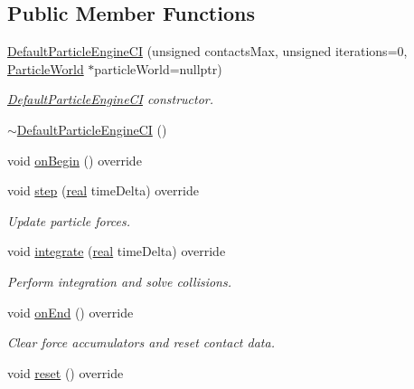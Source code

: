 \subsection*{Public Member Functions}
\begin{DoxyCompactItemize}
\item 
\mbox{\hyperlink{classr3_1_1_default_particle_engine_c_i_a5f7619a5dd227d681d5dcbde6e8368eb}{Default\+Particle\+Engine\+CI}} (unsigned contacts\+Max, unsigned iterations=0, \mbox{\hyperlink{classr3_1_1_particle_world}{Particle\+World}} $\ast$particle\+World=nullptr)
\begin{DoxyCompactList}\small\item\em \mbox{\hyperlink{classr3_1_1_default_particle_engine_c_i}{Default\+Particle\+Engine\+CI}} constructor. \end{DoxyCompactList}\item 
\mbox{\hyperlink{classr3_1_1_default_particle_engine_c_i_afb7df43eb7fe45d6bcb15c39e3c30849}{$\sim$\+Default\+Particle\+Engine\+CI}} ()
\item 
void \mbox{\hyperlink{classr3_1_1_default_particle_engine_c_i_aaf2e9ca87bff5e48c8eb59384e9cf180}{on\+Begin}} () override
\item 
void \mbox{\hyperlink{classr3_1_1_default_particle_engine_c_i_a7c58fd00ec521410e1b412e9885ee0d2}{step}} (\mbox{\hyperlink{namespacer3_ab2016b3e3f743fb735afce242f0dc1eb}{real}} time\+Delta) override
\begin{DoxyCompactList}\small\item\em Update particle forces. \end{DoxyCompactList}\item 
void \mbox{\hyperlink{classr3_1_1_default_particle_engine_c_i_a4603707afe6c841a83294a46ea4a1c62}{integrate}} (\mbox{\hyperlink{namespacer3_ab2016b3e3f743fb735afce242f0dc1eb}{real}} time\+Delta) override
\begin{DoxyCompactList}\small\item\em Perform integration and solve collisions. \end{DoxyCompactList}\item 
void \mbox{\hyperlink{classr3_1_1_default_particle_engine_c_i_a6a34c77436d8133560eaa7366c740119}{on\+End}} () override
\begin{DoxyCompactList}\small\item\em Clear force accumulators and reset contact data. \end{DoxyCompactList}\item 
void \mbox{\hyperlink{classr3_1_1_default_particle_engine_c_i_a97757c62b4cb1266da29e2b5625bb9d3}{reset}} () override

\end{DoxyCompactItemize}
